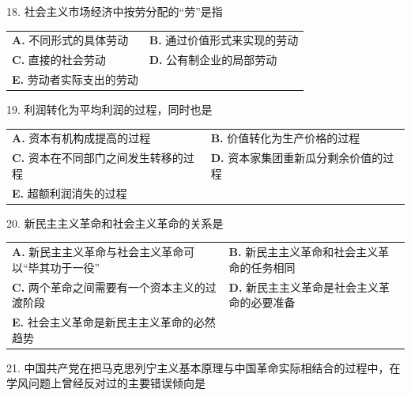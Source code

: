 \documentclass[UTF8,11pt]{ctexart}
\begin{document}
18. 社会主义市场经济中按劳分配的“劳”是指


\begin{center}\begin{tabular}{>{\raggedright\arraybackslash}p{\dimexpr(\linewidth-4\tabcolsep)/2\relax}>{\raggedright\arraybackslash}p{\dimexpr(\linewidth-4\tabcolsep)/2\relax}}
\textbf{A.} 不同形式的具体劳动 & \textbf{B.} 通过价值形式来实现的劳动\\[.35em]
\textbf{C.} 直接的社会劳动 & \textbf{D.} 公有制企业的局部劳动\\[.35em]
\textbf{E.} 劳动者实际支出的劳动 & \\[.35em]\end{tabular}\end{center}

19. 利润转化为平均利润的过程，同时也是


\begin{center}\begin{tabular}{>{\raggedright\arraybackslash}p{\dimexpr(\linewidth-4\tabcolsep)/2\relax}>{\raggedright\arraybackslash}p{\dimexpr(\linewidth-4\tabcolsep)/2\relax}}
\textbf{A.} 资本有机构成提高的过程 & \textbf{B.} 价值转化为生产价格的过程\\[.35em]
\textbf{C.} 资本在不同部门之间发生转移的过程 & \textbf{D.} 资本家集团重新瓜分剩余价值的过程\\[.35em]
\textbf{E.} 超额利润消失的过程 & \\[.35em]\end{tabular}\end{center}

20. 新民主主义革命和社会主义革命的关系是


\begin{center}\begin{tabular}{>{\raggedright\arraybackslash}p{\dimexpr(\linewidth-4\tabcolsep)/2\relax}>{\raggedright\arraybackslash}p{\dimexpr(\linewidth-4\tabcolsep)/2\relax}}
\textbf{A.} 新民主主义革命与社会主义革命可以“毕其功于一役” & \textbf{B.} 新民主主义革命和社会主义革命的任务相同\\[.35em]
\textbf{C.} 两个革命之间需要有一个资本主义的过渡阶段 & \textbf{D.} 新民主主义革命是社会主义革命的必要准备\\[.35em]
\textbf{E.} 社会主义革命是新民主主义革命的必然趋势 & \\[.35em]\end{tabular}\end{center}

21. 中国共产党在把马克思列宁主义基本原理与中国革命实际相结合的过程中，在学风问题上曾经反对过的主要错误倾向是
\end{document}
